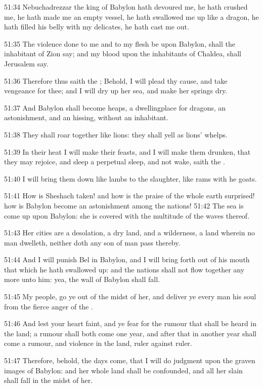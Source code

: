51:34 Nebuchadrezzar the king of Babylon hath devoured me, he hath
crushed me, he hath made me an empty vessel, he hath swallowed me up
like a dragon, he hath filled his belly with my delicates, he hath
cast me out.

51:35 The violence done to me and to my flesh be upon Babylon, shall
the inhabitant of Zion say; and my blood upon the inhabitants of
Chaldea, shall Jerusalem say.

51:36 Therefore thus saith the \LORD; Behold, I will plead thy cause,
and take vengeance for thee; and I will dry up her sea, and make her
springs dry.

51:37 And Babylon shall become heaps, a dwellingplace for dragons, an
astonishment, and an hissing, without an inhabitant.

51:38 They shall roar together like lions: they shall yell as lions'
whelps.

51:39 In their heat I will make their feasts, and I will make them
drunken, that they may rejoice, and sleep a perpetual sleep, and not
wake, saith the \LORD.

51:40 I will bring them down like lambs to the slaughter, like rams
with he goats.

51:41 How is Sheshach taken! and how is the praise of the whole earth
surprised! how is Babylon become an astonishment among the nations!
51:42 The sea is come up upon Babylon: she is covered with the
multitude of the waves thereof.

51:43 Her cities are a desolation, a dry land, and a wilderness, a
land wherein no man dwelleth, neither doth any son of man pass
thereby.

51:44 And I will punish Bel in Babylon, and I will bring forth out of
his mouth that which he hath swallowed up: and the nations shall not
flow together any more unto him: yea, the wall of Babylon shall fall.

51:45 My people, go ye out of the midst of her, and deliver ye every
man his soul from the fierce anger of the \LORD.

51:46 And lest your heart faint, and ye fear for the rumour that shall
be heard in the land; a rumour shall both come one year, and after
that in another year shall come a rumour, and violence in the land,
ruler against ruler.

51:47 Therefore, behold, the days come, that I will do judgment upon
the graven images of Babylon: and her whole land shall be confounded,
and all her slain shall fall in the midst of her.


